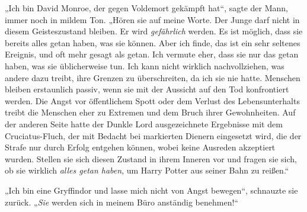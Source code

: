 „Ich bin David Monroe, der gegen Voldemort gekämpft hat“, sagte der Mann, immer noch in mildem Ton.
„Hören sie auf meine Worte. Der Junge darf nicht in diesem Geisteszustand bleiben. Er wird \emph{gefährlich} werden. Es ist möglich, dass sie bereits alles getan haben, was sie können. Aber ich finde, das ist ein sehr seltenes Ereignis, und oft mehr gesagt als getan. Ich vermute eher, dass sie nur das getan haben, was sie üblicherweise tun. Ich kann nicht wirklich nachvollziehen, was andere dazu treibt, ihre Grenzen zu überschreiten, da ich sie nie hatte. Menschen bleiben erstaunlich passiv, wenn sie mit der Aussicht auf den Tod konfrontiert werden. Die Angst vor öffentlichem Spott oder dem Verlust des Lebensunterhalts treibt die Menschen eher zu Extremen und dem Bruch ihrer Gewohnheiten. Auf der anderen Seite hatte der Dunkle Lord ausgezeichnete Ergebnisse mit dem Cruciatus-Fluch, der mit Bedacht bei markierten Dienern eingesetzt wird, die der Strafe nur durch Erfolg entgehen können, wobei keine Ausreden akzeptiert wurden. Stellen sie sich diesen Zustand in ihrem Inneren vor und fragen sie sich, ob sie wirklich \emph{alles getan haben}, um Harry Potter aus seiner Bahn zu reißen.“

„Ich bin eine Gryffindor und lasse mich nicht von Angst bewegen“, schnauzte sie zurück.
„\emph{Sie} werden sich in meinem Büro anständig benehmen!“

